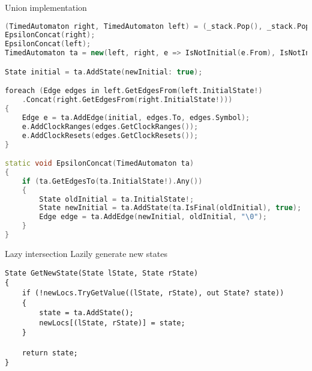 \begin{frame}[fragile]{Union implementation}
    \begin{lstlisting}[language=c++,basicstyle=\tiny]
(TimedAutomaton right, TimedAutomaton left) = (_stack.Pop(), _stack.Pop());
EpsilonConcat(right);
EpsilonConcat(left);
TimedAutomaton ta = new(left, right, e => IsNotInitial(e.From), IsNotInitial);

State initial = ta.AddState(newInitial: true);

foreach (Edge edges in left.GetEdgesFrom(left.InitialState!)
    .Concat(right.GetEdgesFrom(right.InitialState!)))
{
    Edge e = ta.AddEdge(initial, edges.To, edges.Symbol);
    e.AddClockRanges(edges.GetClockRanges());
    e.AddClockResets(edges.GetClockResets());
}

static void EpsilonConcat(TimedAutomaton ta)
{
    if (ta.GetEdgesTo(ta.InitialState!).Any())
    {
        State oldInitial = ta.InitialState!;
        State newInitial = ta.AddState(ta.IsFinal(oldInitial), true);
        Edge edge = ta.AddEdge(newInitial, oldInitial, "\0");
    }
}
    \end{lstlisting}
\end{frame}

\begin{frame}[fragile]{Lazy intersection}
    Lazily generate new states
    \begin{lstlisting}[basicstyle=\tiny]
State GetNewState(State lState, State rState)
{
    if (!newLocs.TryGetValue((lState, rState), out State? state))
    {
        state = ta.AddState();
        newLocs[(lState, rState)] = state;
    }

    return state;
}
    \end{lstlisting}
\end{frame}

